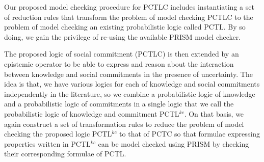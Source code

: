 Our proposed model checking procedure for PCTLC includes instantiating a set of reduction rules that transform the problem of model checking PCTLC to the problem of model checking an existing probabilistic logic called PCTL. By so doing, we gain the privilege of re-using the available PRISM model checker.

The proposed logic of social commitment (PCTLC) is then extended by an epistemic operator to be able to express and reason about the interaction between knowledge and social commitments in the presence of uncertainty. The idea is that, we have various logics for each of knowledge and social commitments independently in the literature, so we combine a probabilistic logic of knowledge and a probabilistic logic of commitments in a single logic that we call the probabilistic logic of knowledge and commitment PCTL$^{kc}$. On that basis, we again construct a set of transformation rules to reduce the problem of model checking the proposed logic PCTL$^{kc}$ to that of PCTC so that formulae expressing properties written in PCTL$^{kc}$ can be model checked using PRISM by checking their corresponding formulae of PCTL.



